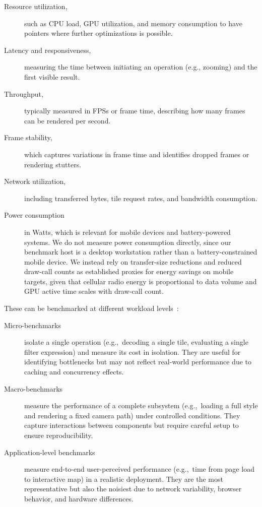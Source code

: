\begin{description}
    \item[Resource utilization,] such as \ac{CPU} load, \ac{GPU} utilization, and memory consumption to have pointers where further optimizations is possible.
    \item[Latency and responsiveness,] measuring the time between initiating an operation (e.g., zooming) and the first visible result.
    \item[Throughput,] typically measured in \acp{FPS} or frame time, describing how many frames can be rendered per second.
    \item[Frame stability,] which captures variations in frame time and identifies dropped frames or rendering stutters.
    \item[Network utilization,] including transferred bytes, tile request rates, and bandwidth consumption.
    \item[Power consumption] in Watts, which is relevant for mobile devices and battery-powered systems.
We do not measure power consumption directly, since our benchmark host is a desktop workstation rather than a battery-constrained mobile device.
We instead rely on transfer-size reductions and reduced draw-call counts as established proxies for energy savings on mobile targets, given that cellular radio energy is proportional to data volume and \ac{GPU} active time scales with draw-call count.
\end{description}

These can be benchmarked at different workload levels~\cite{jainArtComputerSystems1991}:

\begin{description}
    \item[Micro-benchmarks] isolate a single operation (e.g.,\ decoding a single tile, evaluating a single filter expression) and measure its cost in isolation.
They are useful for identifying bottlenecks but may not reflect real-world performance due to caching and concurrency effects.
    \item[Macro-benchmarks] measure the performance of a complete subsystem (e.g.,\ loading a full style and rendering a fixed camera path) under controlled conditions.
They capture interactions between components but require careful setup to ensure reproducibility.
    \item[Application-level benchmarks] measure end-to-end user-perceived performance (e.g.,\ time from page load to interactive map) in a realistic deployment.
They are the most representative but also the noisiest due to network variability, browser behavior, and hardware differences.
\end{description}

